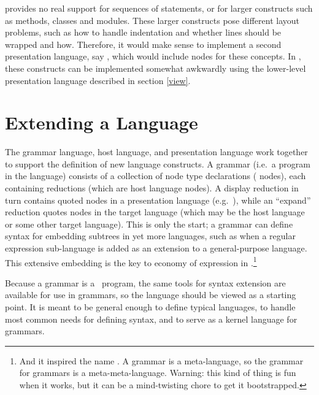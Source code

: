  provides no real support for sequences of statements, or for larger constructs such as methods, classes and modules. These larger constructs pose different layout problems, such as how to handle indentation and whether lines should be wrapped and how. Therefore, it would make sense to implement a second presentation language, say , which would include nodes for these concepts. In \Meta, these constructs can be implemented somewhat awkwardly using the lower-level presentation language described in section \ref{view}.

%
%

\section{Extending a Language}
The grammar language, host language, and presentation language work together to support the definition of new language constructs. A grammar (i.e.\ a program in the  language) consists of a collection of node type declarations ( nodes), each containing reductions (which are host language nodes). A display reduction in turn contains quoted nodes in a presentation language (e.g.\ ), while an ``expand'' reduction quotes nodes in the target language (which may be the host language or some other target language). This is only the start; a grammar can define syntax for embedding subtrees in yet more languages, such as when a regular expression sub-language is added as an extension to a general-purpose language. This extensive embedding is the key to economy of expression in \Meta.\footnote{And it inspired the name \Meta. A grammar is a meta-language, so the grammar for grammars is a meta-meta-language. Warning: this kind of thing is fun when it works, but it can be a mind-twisting chore to get it bootstrapped.}


Because a grammar is a \Meta\ program, the same tools for syntax extension are available for use in grammars, so the  language should be viewed as a starting point. It is meant to be general enough to define typical languages, to handle most common needs for defining syntax, and to serve as a kernel language for grammars.

